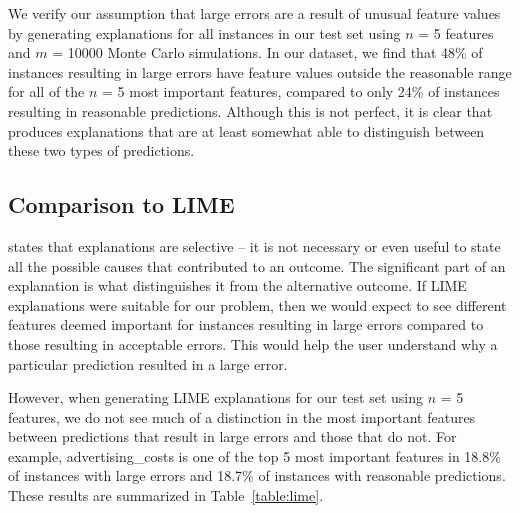 We verify our assumption that large errors are a result of unusual feature values by generating \OurMethod{} explanations for all instances in our test set using $n$ = 5 features and $m$ = 10000 Monte Carlo simulations. In our dataset, we find that 48\% of instances resulting in large errors have feature values outside the reasonable range for all of the $n$ = 5 most important features, compared to only 24\% of instances resulting in reasonable predictions. 
Although this is not perfect, it is clear that \OurMethod{} produces explanations that are at least somewhat able to distinguish between these two types of predictions. 


\subsection{Comparison to LIME}
\label{section:lime}
\citet{hilton-2017-social} states that explanations are selective -- it is not necessary or even useful to state all the possible causes that contributed to an outcome. 
The significant part of an explanation is what distinguishes it from the alternative outcome.
If LIME explanations were suitable for our problem, then we would expect to see different features deemed important for instances resulting in large errors compared to those resulting in acceptable errors. 
This would help the user understand why a particular prediction resulted in a large error. 

However, when generating LIME explanations for our test set using $n$ = 5 features, we do not see much of a distinction in the most important features between predictions that result in large errors and those that do not. 
For example, advertising\_costs is one of the top 5 most important features in 18.8\% of instances with large errors and 18.7\% of instances with reasonable predictions. 
These results are summarized in Table~\ref{table:lime}. 
\medskip

